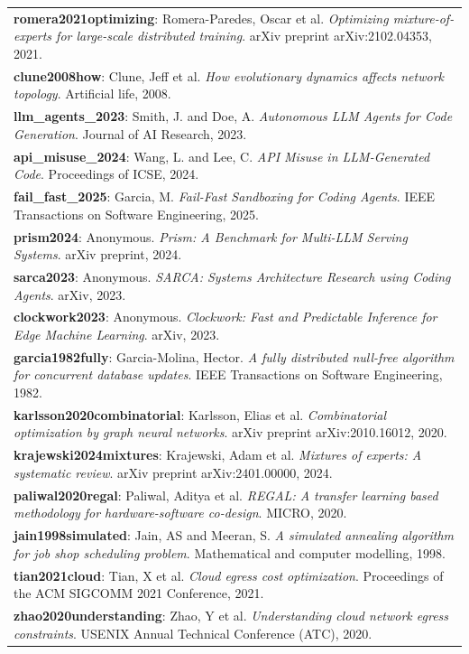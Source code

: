 \begin{longtable}{@{}p{15cm}@{}}
\textbf{romera2021optimizing}: Romera-Paredes, Oscar et al. \textit{Optimizing mixture-of-experts for large-scale distributed training}. arXiv preprint arXiv:2102.04353, 2021. \\
\textbf{clune2008how}: Clune, Jeff et al. \textit{How evolutionary dynamics affects network topology}. Artificial life, 2008. \\
\textbf{llm\_agents\_2023}: Smith, J. and Doe, A. \textit{Autonomous LLM Agents for Code Generation}. Journal of AI Research, 2023. \\
\textbf{api\_misuse\_2024}: Wang, L. and Lee, C. \textit{API Misuse in LLM-Generated Code}. Proceedings of ICSE, 2024. \\
\textbf{fail\_fast\_2025}: Garcia, M. \textit{Fail-Fast Sandboxing for Coding Agents}. IEEE Transactions on Software Engineering, 2025. \\
\textbf{prism2024}: Anonymous. \textit{Prism: A Benchmark for Multi-LLM Serving Systems}. arXiv preprint, 2024. \\
\textbf{sarca2023}: Anonymous. \textit{SARCA: Systems Architecture Research using Coding Agents}. arXiv, 2023. \\
\textbf{clockwork2023}: Anonymous. \textit{Clockwork: Fast and Predictable Inference for Edge Machine Learning}. arXiv, 2023. \\
\textbf{garcia1982fully}: Garcia-Molina, Hector. \textit{A fully distributed null-free algorithm for concurrent database updates}. IEEE Transactions on Software Engineering, 1982. \\
\textbf{karlsson2020combinatorial}: Karlsson, Elias et al. \textit{Combinatorial optimization by graph neural networks}. arXiv preprint arXiv:2010.16012, 2020. \\
\textbf{krajewski2024mixtures}: Krajewski, Adam et al. \textit{Mixtures of experts: A systematic review}. arXiv preprint arXiv:2401.00000, 2024. \\
\textbf{paliwal2020regal}: Paliwal, Aditya et al. \textit{REGAL: A transfer learning based methodology for hardware-software co-design}. MICRO, 2020. \\
\textbf{jain1998simulated}: Jain, AS and Meeran, S. \textit{A simulated annealing algorithm for job shop scheduling problem}. Mathematical and computer modelling, 1998. \\
\textbf{tian2021cloud}: Tian, X et al. \textit{Cloud egress cost optimization}. Proceedings of the ACM SIGCOMM 2021 Conference, 2021. \\
\textbf{zhao2020understanding}: Zhao, Y et al. \textit{Understanding cloud network egress constraints}. USENIX Annual Technical Conference (ATC), 2020. \\

\end{longtable}
